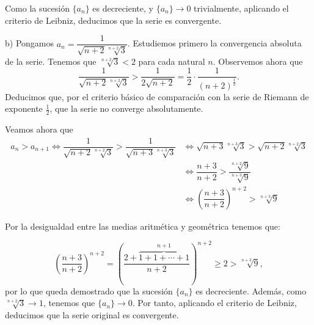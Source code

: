 \documentclass[10pt,a4paper]{article}
\begin{document}
	Como la sucesión $\{a_n\}$ es decreciente, y $ \{a_n\} \rightarrow 0$ trivialmente, aplicando el criterio de Leibniz, deducimos que la serie es convergente. \newline 
	
	b) Pongamos $a_n = \dfrac{1}{\sqrt{n+2} \sqrt[n+2]{3}}$. Estudiemos primero la convergencia absoluta de la serie. Tenemos que $\sqrt[n+2]{3} < 2$ para cada natural $n$. Observemos ahora que $$ \dfrac{1}{\sqrt{n+2} \sqrt[n+2]{3}} > \dfrac{1}{2 \sqrt{n+2}} = \dfrac{1}{2} \cdot \dfrac{1}{(n+2) ^{\tfrac{1}{2}}}.$$
	Deducimos que, por el criterio básico de comparación con la serie de Riemann de exponente $\frac{1}{2}$, que la serie no converge absolutamente. \newline	
	
	Veamos ahora que 
	\begin{equation*}
		\begin{split}
			a_n > a_{n+1} \Leftrightarrow \dfrac{1}{\sqrt{n+2} \sqrt[n+2]{3}} > \dfrac{1}{\sqrt{n+3} \sqrt[n+3]{3}} & \Leftrightarrow \sqrt{n+3} \sqrt[n+3]{3} > \sqrt{n+2} \sqrt[n+2]{3} \\
			& \Leftrightarrow \dfrac{n+3}{n+2} > \dfrac{\sqrt[n+2]{9}}{\sqrt[n+3]{9}} \\
			& \Leftrightarrow \left(\dfrac{n+3}{n+2}\right) ^{n+2} > \sqrt[n+3]{9}
		\end{split}
	\end{equation*}

	Por la desigualdad entre las medias aritmética y geométrica tenemos que:
	
	$$\left(\dfrac{n+3}{n+2}\right) ^{n+2} = \left( \dfrac{2 + \overbrace{1 + 1 + \cdots + 1}^{n+1}}{n+2} \right) ^ {n+2} \geq 2 > \sqrt[n+3]{9},$$
	por lo que queda demostrado que la sucesión $\{a_n\}$ es decreciente. Además, como $\sqrt[n+2]{3} \rightarrow 1$, tenemos que $\{a_n\} \rightarrow 0$. Por tanto, aplicando el criterio de Leibniz, deducimos que la serie original es convergente.
\end{document}
